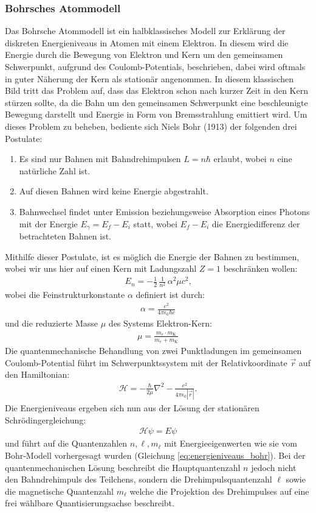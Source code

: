 \documentclass[11pt, a4paper]{article}
\numberwithin{equation}{section}
\begin{document}
\subsubsection{Bohrsches Atommodell}
Das Bohrsche Atommodell ist ein halbklassisches Modell zur Erklärung der diskreten Energieniveaus in Atomen mit einem Elektron.
In diesem wird die Energie durch die Bewegung von Elektron und Kern um den gemeinsamen Schwerpunkt, aufgrund des Coulomb-Potentials, beschrieben, dabei wird oftmals in guter Näherung der Kern als stationär angenommen.
In diesem klassischen Bild tritt das Problem auf, dass das Elektron schon nach kurzer Zeit in den Kern stürzen sollte, da die Bahn um den gemeinsamen Schwerpunkt eine beschleunigte Bewegung darstellt und Energie in Form von Bremsstrahlung emittiert wird.
Um dieses Problem zu beheben, bediente sich Niels Bohr (1913) der folgenden drei Postulate:
\begin{enumerate}
	\item Es sind nur Bahnen mit Bahndrehimpulsen $L = n \hbar$ erlaubt, wobei $n$ eine natürliche Zahl ist.
	\item Auf diesen Bahnen wird keine Energie abgestrahlt.
	\item Bahnwechsel findet unter Emission beziehungsweise Absorption eines Photons mit der Energie $E_\gamma = E_f - E_i$ statt, wobei $E_f - E_i$ die Energiedifferenz der betrachteten Bahnen ist.
\end{enumerate}
Mithilfe dieser Postulate, ist es möglich die Energie der Bahnen zu bestimmen, wobei wir uns hier auf einen Kern mit Ladungszahl $Z = \num{1}$ beschränken wollen:
\begin{align}
	\label{eq:energieniveaus_bohr}
	E_n = - \frac{1}{2} \, \frac{1}{n^2} \, \alpha^2 \mu c^2 \text{,}
\end{align}
wobei die Feinstrukturkonstante $\alpha$ definiert ist durch:
\begin{align}
	\alpha = \frac{e^2}{4 \pi \epsilon_0 \hbar c}
\end{align}
und die reduzierte Masse $\mu$ des Systems Elektron-Kern:
\begin{align}
	\mu = \frac{m_e \cdot m_\mathrm{K}}{m_e + m_\mathrm{K}}
\end{align}
Die quantenmechanische Behandlung von zwei Punktladungen im gemeinsamen Coulomb-Potential führt im Schwerpunktssystem mit der Relativkoordinate $\vec{r}$ auf den Hamiltonian:
\begin{align}
	\mathcal{H} = - \frac{\hbar}{2 \mu} \nabla^2 - \frac{e^2}{4 \pi \epsilon_0 |\vec{r}|} \text{.}
\end{align}
Die Energieniveaus ergeben sich nun aus der Lösung der stationären Schrödingergleichung:
\begin{align}
	\mathcal{H} \psi = E \psi
\end{align}
und führt auf die Quantenzahlen $n, \ell, m_\ell$ mit Energieeigenwerten wie sie vom Bohr-Modell vorhergesagt wurden (Gleichung \ref{eq:energieniveaus_bohr}).
Bei der quantenmechanischen Lösung beschreibt die Hauptquantenzahl $n$ jedoch nicht den Bahndrehimpuls des Teilchens, sondern die Drehimpulsquantenzahl $\ell$ sowie die magnetische Quantenzahl $m_\ell$ welche die Projektion des Drehimpulses auf eine frei wählbare Quantisierungsachse beschreibt.
\end{document}
